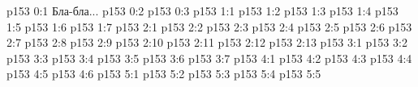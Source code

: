 \author{Промежуточные создания}
\vs p153 0:1  Бла-бла...
\vs p153 0:2 
\vs p153 0:3 
\vs p153 1:1 
\vs p153 1:2 
\vs p153 1:3 
\vs p153 1:4 \pc 
\vs p153 1:5 \pc 
\vs p153 1:6 
\vs p153 1:7 
\vs p153 2:1 
\vs p153 2:2 
\vs p153 2:3 
\vs p153 2:4 
\vs p153 2:5 
\vs p153 2:6 
\vs p153 2:7 
\vs p153 2:8 
\vs p153 2:9 
\vs p153 2:10 \pc 
\vs p153 2:11 
\vs p153 2:12 
\vs p153 2:13 
\vs p153 3:1 
\vs p153 3:2 
\vs p153 3:3 
\vs p153 3:4 
\vs p153 3:5 
\vs p153 3:6 
\vs p153 3:7 
\vs p153 4:1 
\vs p153 4:2 
\vs p153 4:3 
\vs p153 4:4 
\vs p153 4:5 
\vs p153 4:6 
\vs p153 5:1 
\vs p153 5:2 
\vs p153 5:3 
\vs p153 5:4 
\vs p153 5:5 
\quizlink
